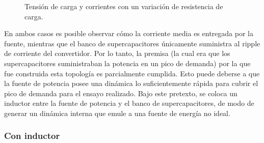 \begin{figure}[hbt!]
  \centering
  \caption{Tensión de carga y corrientes con un variación de resistencia de carga.}
  \label{sc-fuente}
\end{figure}

En ambos casos es posible observar cómo la corriente media es entregada por la fuente, mientras que el banco de supercapacitores únicamente suministra al ripple de corriente del convertidor. Por lo tanto, la premisa (la cual era que los supercapacitores suministraban la potencia en un pico de demanda) por la que fue construida esta topología es parcialmente cumplida. Esto puede deberse a que la fuente de potencia posee una dinámica lo suficientemente rápida para cubrir el pico de demanda para el ensayo realizado. Bajo este pretexto, se coloca un inductor entre la fuente de potencia y el banco de supercapacitores, de modo de generar un dinámica interna que emule a una fuente de energía no ideal.

\subsubsection{Con inductor}

